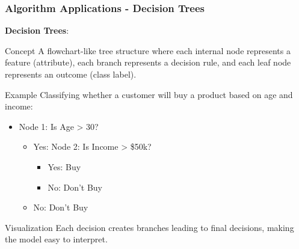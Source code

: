\documentclass[aspectratio=169]{beamer}
\begin{document}
\begin{frame}[fragile]
    \frametitle{Algorithm Applications - Decision Trees}
    \textbf{Decision Trees}:
    \begin{block}{Concept}
        A flowchart-like tree structure where each internal node represents a feature (attribute), each branch represents a decision rule, and each leaf node represents an outcome (class label).
    \end{block}
    
    \begin{block}{Example}
        Classifying whether a customer will buy a product based on age and income:
        \begin{itemize}
            \item Node 1: Is Age > 30?
            \begin{itemize}
                \item Yes: Node 2: Is Income > \$50k?
                \begin{itemize}
                    \item Yes: Buy
                    \item No: Don't Buy
                \end{itemize}
                \item No: Don't Buy
            \end{itemize}
        \end{itemize}
    \end{block}
    
    \begin{block}{Visualization}
        Each decision creates branches leading to final decisions, making the model easy to interpret.
    \end{block}
\end{frame}
\end{document}
